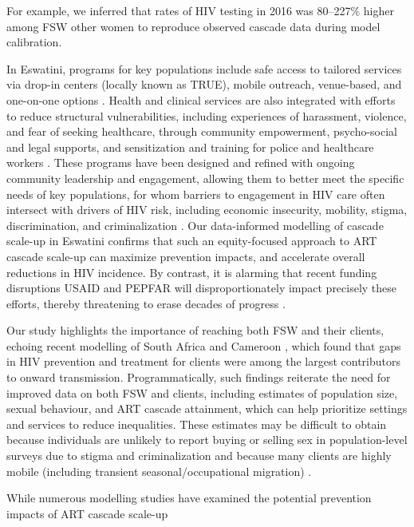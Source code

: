 For example, we inferred that rates of HIV testing in 2016 was 80--227\% higher
among FSW \vs other women to reproduce observed cascade data during model calibration.
\par
In Eswatini, programs for key populations include safe access to tailored services via
drop-in centers (locally known as TRUE), mobile outreach, venue-based,
and one-on-one options \cite{EswIBBS2022}.
Health and clinical services are also integrated with
efforts to reduce structural vulnerabilities, including
experiences of harassment, violence, and fear of seeking healthcare,
through community empowerment, psycho-social and legal supports, and
sensitization and training for police and healthcare workers \cite{EswIBBS2022}.
These programs have been designed and refined with ongoing community leadership and engagement,
allowing them to better meet the specific needs of key populations,
for whom barriers to engagement in HIV care often intersect with drivers of HIV risk,
including economic insecurity, mobility, stigma, discrimination, and criminalization
\cite{Lancaster2016sr,Wanyenze2016,Schwartz2017,Schmidt-Sane2022,Camlin2019,Baral2019}.
Our data-informed modelling of cascade scale-up in Eswatini confirms that
such an equity-focused approach to ART cascade scale-up
can maximize prevention impacts, and accelerate overall reductions in HIV incidence.
By contrast, it is alarming that recent funding disruptions USAID and PEPFAR
will disproportionately impact precisely these efforts,
thereby threatening to erase decades of progress \cite{KPstate2024,Lankiewicz2025}.
\par
Our study highlights the importance of reaching both FSW and their clients,
echoing recent modelling of South Africa and Cameroon \cite{Stone2021,Silhol2024ptr},
which found that gaps in HIV prevention and treatment for clients
were among the largest contributors to onward transmission.
Programmatically, such findings reiterate the need for improved data on both FSW and clients,
including estimates of population size, sexual behaviour, and ART cascade attainment,
which can help prioritize settings and services to reduce inequalities.
These estimates may be difficult to obtain
because individuals are unlikely to report buying or selling sex in population-level surveys
due to stigma and criminalization \cite{Behanzin2013} and
because many clients are highly mobile
(including transient seasonal/occupational migration) \cite{Camlin2019}.
\par
While numerous modelling studies have examined
the potential prevention impacts of ART cascade scale-up
